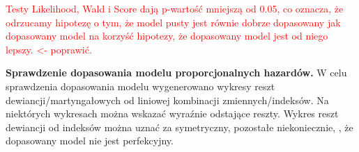 \documentclass[]{article}
\begin{document}
\textcolor{red}{Testy Likelihood, Wald i Score dają p-wartość mniejszą od 0.05, co oznacza, że odrzucamy hipotezę o tym, że model pusty jest równie dobrze dopasowany jak dopasowany model na korzyść hipotezy, że dopasowany model jest od niego lepszy. <- poprawić.}

\newpage
\textbf{Sprawdzenie dopasowania modelu proporcjonalnych hazardów.}
\newline
W celu sprawdzenia dopasowania modelu wygenerowano wykresy reszt
dewiancji/martyngałowych od liniowej kombinacji zmiennych/indeksów. Na
niektórych wykresach można wskazać wyraźnie odstające reszty. Wykres
reszt dewiancji od indeksów można uznać za symetryczny, pozostałe
niekoniecznie, , że dopasowany model nie jest
perfekcyjny.

\begin{figure}[hbt!]
  \vspace{-10pt}
  \begin{center}

\end{center}
\end{figure}
\end{document}
